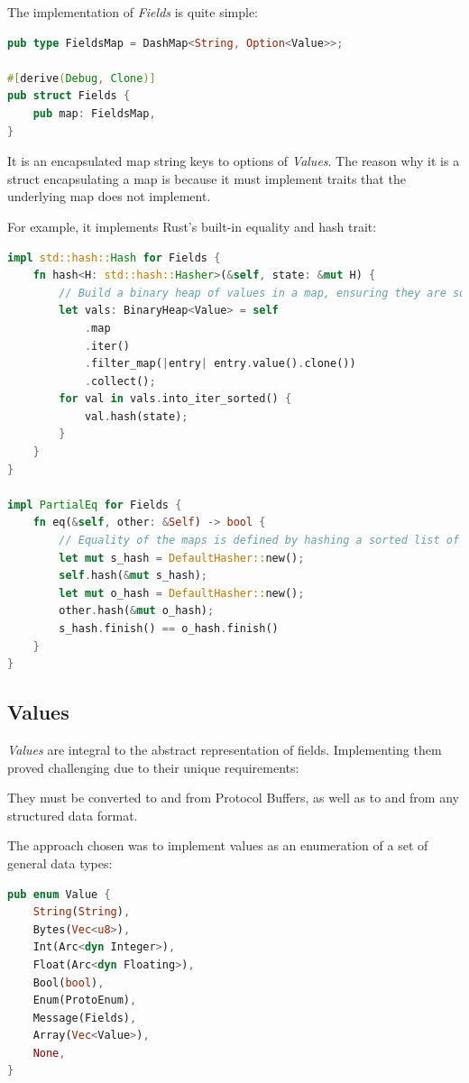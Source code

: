 \documentclass[a4paper,12pt]{report}
\begin{document}
The implementation of \textit{Fields} is quite simple:

\begin{lstlisting}[language=Rust]
pub type FieldsMap = DashMap<String, Option<Value>>;

#[derive(Debug, Clone)]
pub struct Fields {
    pub map: FieldsMap,
}
\end{lstlisting}

It is an encapsulated map string keys to options \cite{option} of \textit{Values}.
The reason why it is a struct encapsulating a map is because it must implement traits that the underlying map does not implement.

For example, it implements Rust's built-in equality and hash trait:

\begin{lstlisting}[language=Rust]
impl std::hash::Hash for Fields {
    fn hash<H: std::hash::Hasher>(&self, state: &mut H) {
        // Build a binary heap of values in a map, ensuring they are sorted.
        let vals: BinaryHeap<Value> = self
            .map
            .iter()
            .filter_map(|entry| entry.value().clone())
            .collect();
        for val in vals.into_iter_sorted() {
            val.hash(state);
        }
    }
}

impl PartialEq for Fields {
    fn eq(&self, other: &Self) -> bool {
        // Equality of the maps is defined by hashing a sorted list of thier values and comparing them.
        let mut s_hash = DefaultHasher::new();
        self.hash(&mut s_hash);
        let mut o_hash = DefaultHasher::new();
        other.hash(&mut o_hash);
        s_hash.finish() == o_hash.finish()
    }
}
\end{lstlisting}

\subsection{Values}

\textit{Values} are integral to the abstract representation of fields. 
Implementing them proved challenging due to their unique requirements:

They must be converted to and from Protocol Buffers, as well as to and from any structured data format.

The approach chosen was to implement values as an enumeration of a set of general data types:

\begin{lstlisting}[language=Rust]
pub enum Value {
    String(String),
    Bytes(Vec<u8>),
    Int(Arc<dyn Integer>),
    Float(Arc<dyn Floating>),
    Bool(bool),
    Enum(ProtoEnum),
    Message(Fields),
    Array(Vec<Value>),
    None,
}
\end{lstlisting}
\end{document}
